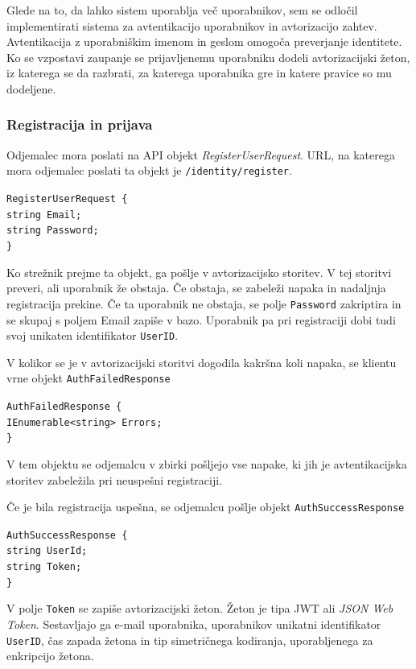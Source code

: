 \documentclass[a4paper, 12pt]{book}
\begin{document}
Glede na to, da lahko sistem uporablja več uporabnikov, sem se odločil implementirati sistema za avtentikacijo uporabnikov in avtorizacijo zahtev.
Avtentikacija z uporabniškim imenom in geslom omogoča preverjanje identitete.
Ko se vzpostavi zaupanje se prijavljenemu uporabniku dodeli avtorizacijski žeton, iz katerega se da razbrati, za katerega uporabnika gre in katere pravice so mu dodeljene.

\subsubsection{Registracija in prijava}

Odjemalec mora poslati na API objekt \textit{RegisterUserRequest}.
URL, na katerega mora odjemalec poslati ta objekt je \texttt{/identity/register}.

\noindent \texttt{RegisterUserRequest \{ \\
	string Email; \\
	string Password; \\
\} }

Ko strežnik prejme ta objekt, ga pošlje v avtorizacijsko storitev.
V tej storitvi preveri, ali uporabnik že obstaja.
Če obstaja, se zabeleži napaka in nadaljnja registracija prekine.
Če ta uporabnik ne obstaja, se polje \texttt{Password} zakriptira in se skupaj s poljem Email zapiše v bazo.
Uporabnik pa pri registraciji dobi tudi svoj unikaten identifikator \texttt{UserID}.

V kolikor se je v avtorizacijski storitvi dogodila kakršna koli napaka, se klientu vrne objekt \texttt{AuthFailedResponse}

\noindent \texttt{AuthFailedResponse \{ \\
  IEnumerable<string> Errors; \\
\} }

\noindent V tem objektu se odjemalcu v zbirki pošljejo vse napake, ki jih je avtentikacijska storitev zabeležila pri neuspešni registraciji. 

Če je bila registracija uspešna, se odjemalcu pošlje objekt \texttt{AuthSuccessResponse}

\noindent \texttt{AuthSuccessResponse \{ \\
  string UserId; \\
  string Token; \\
\} }

\noindent V polje \texttt{Token} se zapiše avtorizacijski žeton.
Žeton je tipa JWT ali \textit{JSON Web Token}.
Sestavljajo ga e-mail uporabnika, uporabnikov unikatni identifikator \texttt{UserID}, čas zapada žetona in tip simetričnega kodiranja, uporabljenega za enkripcijo žetona.
\end{document}
